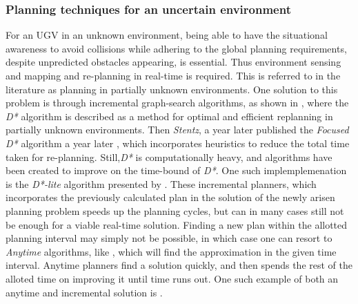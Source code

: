 \subsubsection{Planning techniques for an uncertain environment}
For an UGV in an unknown environment, being able to have the situational
awareness to avoid collisions while adhering to the global planning
requirements, despite unpredicted obstacles appearing, is essential. Thus
environment sensing and mapping and re-planning in real-time is required. This
is referred to in the literature as planning in partially unknown environments.
One solution to this problem is through incremental graph-search algorithms, as
shown in \cite[Stentz]{stentzOptimalEfficientPath}, where the \textsl{D*} algorithm is
described as a method for optimal and efficient replanning in partially unknown
environments. Then \textit{Stentz}, a year later published the \textit{Focused
  D*} algorithm a year later \cite{stentz1995focussed}, which incorporates
heuristics to reduce the total time taken for re-planning. Still,\textit{D*} is
computationally heavy, and algorithms have been created to improve on the
time-bound of \textit{D*}. One such implemplemenation is the \textit{D*-lite}
algorithm presented by \cite[Koenig]{koenig2002d}. These incremental planners,
which incorporates the previously calculated plan in the solution of the newly
arisen planning problem speeds up the planning cycles, but can in many cases
still not be enough for a viable real-time solution. Finding a new plan within
the allotted planning interval may simply not be possible, in which case one can
resort to \textit{Anytime} algorithms, like \cite[Karaman et.
al]{karamanAnytimeMotionPlanning2011}, which will find the approximation in the given time
interval. Anytime planners find a solution quickly, and then spends the rest of
the alloted time on improving it until time runs out. One such example of both
an anytime and incremental solution is \cite[Likachev]{likhachevAnytimeSearchDynamic2008}.

